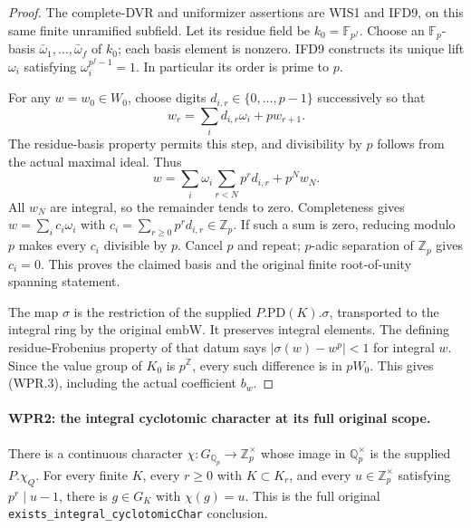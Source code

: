 \documentclass[11pt,a4paper]{article}
\numberwithin{equation}{section}
\theoremstyle{remark}\newtheorem{remark}[theorem]{Remark}
\begin{document}
\begin{proof}
The complete-DVR and uniformizer assertions are WIS1 and IFD9,
on this same finite unramified subfield. Let its residue field be
$k_0=\mathbb F_{p^f}$. Choose an $\mathbb F_p$-basis
$\bar\omega_1,\ldots,\bar\omega_f$ of $k_0$; each basis element
is nonzero. IFD9 constructs its unique lift $\omega_i$ satisfying
$\omega_i^{p^f-1}=1$. In particular its order is prime to $p$.

For any $w=w_0\in W_0$, choose digits $d_{i,r}\in\{0,\ldots,p-1\}$
successively so that
\[
 w_r=\sum_i d_{i,r}\omega_i+p w_{r+1}.
\]
The residue-basis property permits this step, and divisibility
by $p$ follows from the actual maximal ideal. Thus
\[
 w=\sum_i\omega_i\sum_{r<N}p^r d_{i,r}+p^Nw_N.
\]
All $w_N$ are integral, so the remainder tends to zero. Completeness
gives $w=\sum_i c_i\omega_i$ with
$c_i=\sum_{r\geq0}p^r d_{i,r}\in\mathbb Z_p$. If such a sum is
zero, reducing modulo $p$ makes every $c_i$ divisible by $p$.
Cancel $p$ and repeat; $p$-adic separation of $\mathbb Z_p$ gives
$c_i=0$. This proves the claimed basis and the original finite
root-of-unity spanning statement.

The map $\sigma$ is the restriction of the supplied
$P.\mathrm{PD}(K).\sigma$, transported to the integral ring by
the original $\mathrm{embW}$. It preserves integral elements.
The defining residue-Frobenius property of that datum says
$|\sigma(w)-w^p|<1$ for integral $w$. Since the value group of
$K_0$ is $p^{\mathbb Z}$, every such difference is in $pW_0$.
This gives (WPR.3), including the actual coefficient $b_w$.
\end{proof}

\paragraph{WPR2: the integral cyclotomic character at its full original scope.}
\label{claim:WPR2}
There is a continuous character
$\chi:G_{\mathbb Q_p}\to\mathbb Z_p^\times$ whose image in
$\mathbb Q_p^\times$ is the supplied $P.\chi_Q$. For every finite
$K$, every $r\geq0$ with $K\subset K_r$, and every
$u\in\mathbb Z_p^\times$ satisfying $p^r\mid u-1$, there is
$g\in G_K$ with $\chi(g)=u$. This is the full original
\texttt{exists\_\allowbreak integral\_\allowbreak cyclotomic\allowbreak Char} conclusion.
\end{document}
